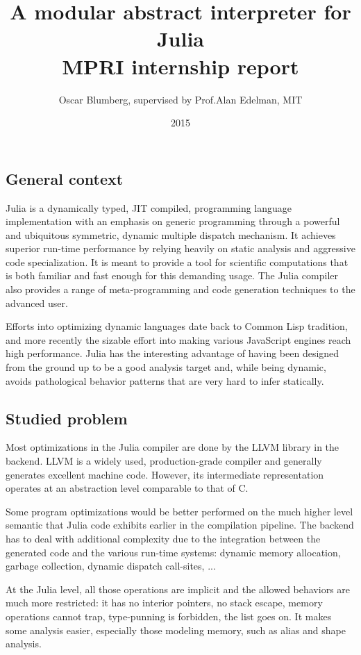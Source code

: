 \documentclass[11pt]{article}
\title{\vspace{-6ex}A modular abstract interpreter for Julia \\ MPRI internship report}
\author{Oscar Blumberg, supervised by Prof.\@ Alan Edelman, MIT}
\date{2015}
\begin{document}
\onehalfspacing
\maketitle

\thispagestyle{empty}
\vspace{1.5ex}
\subsection*{General context}

Julia\cite{julia-paper,julia-web} is a dynamically typed, JIT compiled, programming language implementation with an emphasis on generic programming through a powerful and ubiquitous symmetric, dynamic multiple dispatch mechanism. It achieves superior run-time performance by relying heavily on static analysis and aggressive code specialization. It is meant to provide a tool for scientific computations that is both familiar and fast enough for this demanding usage. The Julia compiler also provides a range of meta-programming and code generation techniques to the advanced user.

Efforts into optimizing dynamic languages date back to Common Lisp tradition\cite{cl}, and more recently the sizable effort into making various JavaScript engines reach high performance\cite{js-trace}. Julia has the interesting advantage of having been designed from the ground up to be a good analysis target and, while being dynamic, avoids pathological behavior patterns that are very hard to infer statically.

\subsection*{Studied problem}

Most optimizations in the Julia compiler are done by the LLVM\cite{llvm} library in the backend. LLVM is a widely used, production-grade compiler and generally generates excellent machine code. However, its intermediate representation operates at an abstraction level comparable to that of C.

Some program optimizations would be better performed on the much higher level semantic that Julia code exhibits earlier in the compilation pipeline. The backend has to deal with additional complexity due to the integration between the generated code and the various run-time systems: dynamic memory allocation, garbage collection, dynamic dispatch call-sites, ...

At the Julia level, all those operations are implicit and the allowed behaviors are much more restricted: it has no interior pointers, no stack escape, memory operations cannot trap, type-punning is forbidden, the list goes on. It makes some analysis easier, especially those modeling memory, such as alias and shape analysis.
\end{document}
